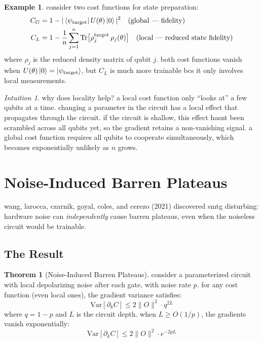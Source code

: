 \documentclass[11pt,a4paper]{article}
\theoremstyle{definition}
\newtheorem{example}{Example}[section]
\newtheorem{theorem}{Theorem}[section]
\theoremstyle{remark}
\newtheorem*{intuition}{Intuition}
\begin{document}
\begin{example}
consider two cost functions for state preparation:
\begin{align}
    C_G &= 1 - |\bra{\psi_{\text{target}}} U(\theta) \ket{0}|^2 \quad \text{(global --- fidelity)} \\
    C_L &= 1 - \frac{1}{n} \sum_{j=1}^{n} \text{Tr}\big[\rho_j^{\text{target}} \, \rho_j(\theta)\big] \quad \text{(local --- reduced state fidelity)}
\end{align}
where $\rho_j$ is the reduced density matrix of qubit $j$. both cost functions vanish when $U(\theta)\ket{0} = \ket{\psi_{\text{target}}}$, but $C_L$ is much more trainable bcs it only involves local measurements.
\end{example}

\begin{intuition}
why does locality help? a local cost function only ``looks at'' a few qubits at a time. changing a parameter in the circuit has a local effect that propagates through the circuit. if the circuit is shallow, this effect hasnt been scrambled across all qubits yet, so the gradient retains a non-vanishing signal. a global cost function requires all qubits to cooperate simultaneously, which becomes exponentially unlikely as $n$ grows.
\end{intuition}

\section{Noise-Induced Barren Plateaus}

wang, larocca, czarnik, goyal, coles, and cerezo (2021) discovered smtg disturbing: hardware noise can \emph{independently} cause barren plateaus, even when the noiseless circuit would be trainable.

\subsection{The Result}

\begin{theorem}[Noise-Induced Barren Plateaus]
consider a parameterized circuit with local depolarizing noise after each gate, with noise rate $p$. for any cost function (even local ones), the gradient variance satisfies:
\begin{equation}
    \text{Var}[\partial_k C] \leq 2 \|O\|^2 \cdot q^{2L}
\end{equation}
where $q = 1 - p$ and $L$ is the circuit depth. when $L \geq O(1/p)$, the gradients vanish exponentially:
\begin{equation}
    \text{Var}[\partial_k C] \leq 2 \|O\|^2 \cdot e^{-2pL}
\end{equation}
\end{theorem}
\end{document}
